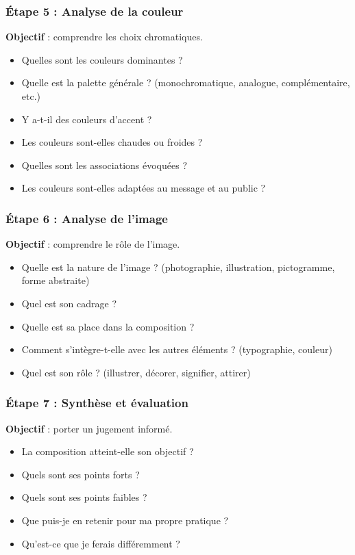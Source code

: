 \subsubsection{Étape 5 : Analyse de la couleur}

\textbf{Objectif} : comprendre les choix chromatiques.

\begin{itemize}
    \item Quelles sont les couleurs dominantes ?
    \item Quelle est la palette générale ? (monochromatique, analogue, complémentaire, etc.)
    \item Y a-t-il des couleurs d'accent ?
    \item Les couleurs sont-elles chaudes ou froides ?
    \item Quelles sont les associations évoquées ?
    \item Les couleurs sont-elles adaptées au message et au public ?
\end{itemize}

\subsubsection{Étape 6 : Analyse de l'image}

\textbf{Objectif} : comprendre le rôle de l'image.

\begin{itemize}
    \item Quelle est la nature de l'image ? (photographie, illustration, pictogramme, forme abstraite)
    \item Quel est son cadrage ?
    \item Quelle est sa place dans la composition ?
    \item Comment s'intègre-t-elle avec les autres éléments ? (typographie, couleur)
    \item Quel est son rôle ? (illustrer, décorer, signifier, attirer)
\end{itemize}

\subsubsection{Étape 7 : Synthèse et évaluation}

\textbf{Objectif} : porter un jugement informé.

\begin{itemize}
    \item La composition atteint-elle son objectif ?
    \item Quels sont ses points forts ?
    \item Quels sont ses points faibles ?
    \item Que puis-je en retenir pour ma propre pratique ?
    \item Qu'est-ce que je ferais différemment ?
\end{itemize}

